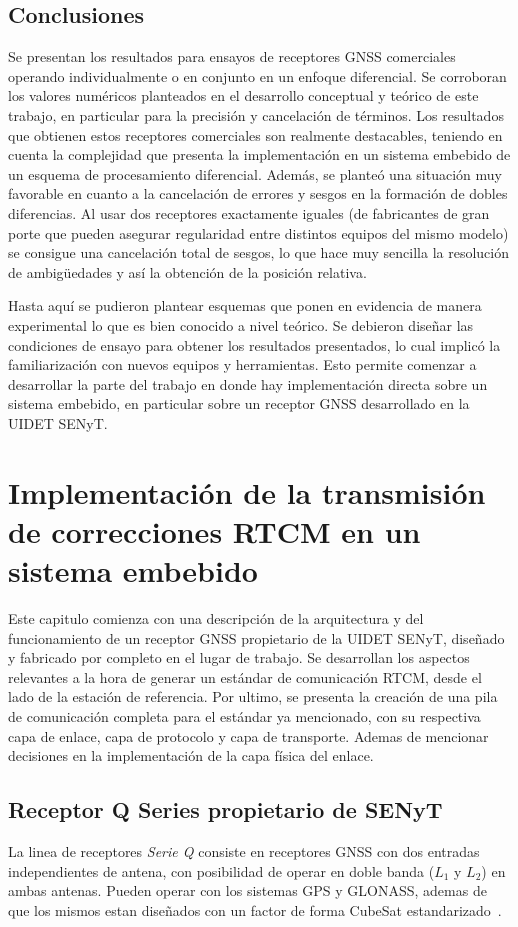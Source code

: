 \documentclass[a4paper,12pt,oneside,onecolumn,final,openright]{book}%
\begin{document}
\section{Conclusiones}
	Se presentan los resultados para ensayos de receptores GNSS comerciales operando individualmente o en conjunto en un enfoque diferencial. Se corroboran los valores numéricos planteados en el desarrollo conceptual y teórico de este trabajo, en particular para la precisión y cancelación de términos. Los resultados que obtienen estos receptores comerciales son realmente destacables, teniendo en cuenta la complejidad que presenta la implementación en un sistema embebido de un esquema de procesamiento diferencial. Además, se planteó una situación muy favorable en cuanto a la cancelación de errores y sesgos en la formación de dobles diferencias. Al usar dos receptores exactamente iguales (de fabricantes de gran porte que pueden asegurar regularidad entre distintos equipos del mismo modelo) se consigue una cancelación total de sesgos, lo que hace muy sencilla la resolución de ambigüedades y así la obtención de la posición relativa. 
	
	Hasta aquí se pudieron plantear esquemas que ponen en evidencia de manera experimental lo que es bien conocido a nivel teórico. Se debieron diseñar las condiciones de ensayo para obtener los resultados presentados, lo cual implicó la familiarización con nuevos equipos y herramientas. Esto permite comenzar a desarrollar la parte del trabajo en donde hay implementación directa sobre un sistema embebido, en particular sobre un receptor GNSS desarrollado en la UIDET SENyT.

\chapter{Implementación de la transmisión de correcciones RTCM en un sistema embebido} 
	Este capitulo comienza con una descripción de la arquitectura y del funcionamiento de un receptor GNSS propietario de la UIDET SENyT, diseñado y fabricado por completo en el lugar de trabajo. Se desarrollan los aspectos relevantes a la hora de generar un estándar de comunicación RTCM, desde el lado de la estación de referencia. Por ultimo, se presenta la creación de una pila de comunicación completa para el estándar ya mencionado, con su respectiva capa de enlace, capa de protocolo y capa de transporte. Ademas de mencionar decisiones en la implementación de la capa física del enlace.
\section{Receptor Q Series propietario de SENyT}
	La linea de receptores \textit{Serie Q} consiste en receptores GNSS con dos entradas independientes de antena, con posibilidad de operar en doble banda ($L_1$ y $L_2$) en ambas antenas. Pueden operar con los sistemas GPS y GLONASS, ademas de que los mismos estan diseñados con un factor de forma CubeSat estandarizado~\cite{Qseries_1}\cite{Qseries_2}.
\end{document}

